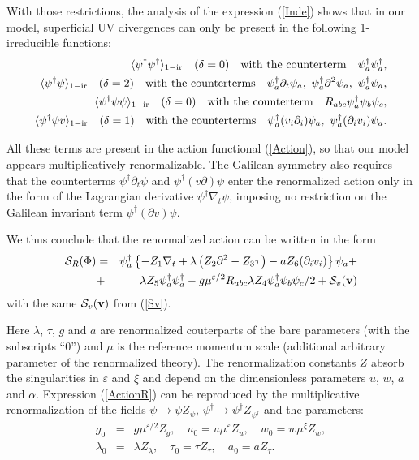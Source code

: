 \documentclass[12pt]{iopart}
\begin{document}
With those restrictions, the analysis
of the expression (\ref{Inde}) shows that in our model, superficial
UV divergences can only be present in the following 1-irreducible
functions:
\begin{eqnarray}
\langle \psi^{\dag} \psi^{\dag} \rangle_{\rm 1-ir} \quad (\delta=0) \quad
{\rm with\ the\ counterterm} \quad \psi_{a}^{\dag}\psi_{a}^{\dag},
\nonumber \\
\langle \psi^{\dag} \psi \rangle_{\rm 1-ir} \quad (\delta=2) \quad
{\rm with\ the\ counterterms} \quad \psi_{a}^{\dag}\partial_{t}\psi_{a}, \
\psi_{a}^{\dag}\partial^{2}\psi_{a}, \ \psi_{a}^{\dag}\psi_{a},
\nonumber \\
\langle \psi^{\dag} \psi \psi \rangle_{\rm 1-ir} \quad (\delta=0) \quad
{\rm with\ the\ counterterm} \quad
R_{abc} \psi_{a}^{\dag} \psi_{b} \psi_{c},
\nonumber \\
\langle \psi^{\dag} \psi v \rangle_{\rm 1-ir} \quad (\delta=1) \quad
{\rm with\ the\ counterterms} \quad \psi_{a}^{\dag} (v_{i}\partial_{i})
\psi_{a}, \ \psi_{a}^{\dag} (\partial_{i} v_{i}) \psi_{a}.
\nonumber
\end{eqnarray}

All these terms are present in the action functional (\ref{Action}),
so that our model appears multiplicatively renormalizable.
The Galilean symmetry also requires that the
counterterms $\psi^{\dag}\partial_{t}\psi$ and $\psi^{\dag}
(v\partial) \psi $ enter the renormalized action only in the form
of the Lagrangian derivative $\psi^{\dag}\nabla_{t}\psi$, imposing
no restriction on the Galilean invariant term $\psi^{\dag}
(\partial v) \psi $.

We thus conclude that the renormalized action can be written in the form
\begin{eqnarray}
{\cal S}_{R} (\Phi) &=&  \psi^{\dag}_{a} \left\{ - Z_{1} \nabla_{t} +
\lambda\left( Z_{2} \partial^{2}- Z_{3}\tau\right) - a Z_{6}
(\partial_{i}v_{i}) \right\} \psi_{a}  +
 \nonumber \\
&+& \lambda Z_{5}  \psi^{\dag}_{a}\psi^{\dag}_{a} -
g\mu^{\varepsilon/2} R_{abc}
\lambda Z_{4}  \psi^{\dag}_{a}\psi_{b} \psi_{c} /2 +  {\cal S}_{v}({\bf v})
\label{ActionR}
\end{eqnarray}
with the same ${\cal S}_{v}({\bf v})$ from (\ref{Sv}).

Here $\lambda$, $\tau$, $g$ and $a$ are renormalized couterparts
of the bare parameters (with the subscripts ``0'') and $\mu$ is
the reference momentum scale (additional arbitrary parameter of the
renormalized theory). The renormalization constants $Z$ absorb
the singularities in $\varepsilon$ and $\xi$ and depend on the
dimensionless parameters $u$, $w$, $a$ and $\alpha$. Expression
(\ref{ActionR}) can be reproduced by the multiplicative
renormalization of the fields $\psi \to \psi Z_{\psi}$,
$\psi^{\dag} \to \psi^{\dag} Z_{\psi^{\dag}}$ and the parameters:
\begin{eqnarray}
g_{0} &=& g \mu^{\varepsilon/2} Z_{g}, \quad u_{0} = u
\mu^{\varepsilon} Z_{u}, \quad
w_{0} = w \mu^{\xi} Z_{w},
\nonumber \\
\lambda_{0} &=& \lambda Z_{\lambda}, \quad \tau_{0} = \tau Z_{\tau},
\quad  a_{0} = a Z_{\tau}.
\label{Multy}
\end{eqnarray}
\end{document}
